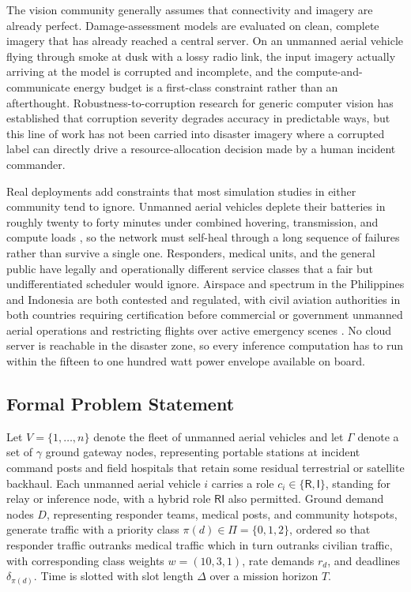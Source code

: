 \documentclass[drones,article,submit,moreauthors]{Definitions/mdpi}
\begin{document}
The vision community generally assumes that connectivity and imagery are already perfect. Damage-assessment models \cite{gupta2019xbd,weber2020building} are evaluated on clean, complete imagery that has already reached a central server. On an unmanned aerial vehicle flying through smoke at dusk with a lossy radio link, the input imagery actually arriving at the model is corrupted and incomplete, and the compute-and-communicate energy budget is a first-class constraint rather than an afterthought. Robustness-to-corruption research for generic computer vision \cite{hendrycks2019benchmarking} has established that corruption severity degrades accuracy in predictable ways, but this line of work has not been carried into disaster imagery where a corrupted label can directly drive a resource-allocation decision made by a human incident commander.

Real deployments add constraints that most simulation studies in either community tend to ignore. Unmanned aerial vehicles deplete their batteries in roughly twenty to forty minutes under combined hovering, transmission, and compute loads \cite{mozaffari2019tutorial,zeng2019energy}, so the network must self-heal through a long sequence of failures rather than survive a single one. Responders, medical units, and the general public have legally and operationally different service classes that a fair but undifferentiated scheduler would ignore. Airspace and spectrum in the Philippines and Indonesia are both contested and regulated, with civil aviation authorities in both countries requiring certification before commercial or government unmanned aerial operations and restricting flights over active emergency scenes \cite{caap_rpas,icao_indonesia_uas}. No cloud server is reachable in the disaster zone, so every inference computation has to run within the fifteen to one hundred watt power envelope available on board.

\subsection{Formal Problem Statement}

Let $V = \{1, \dots, n\}$ denote the fleet of unmanned aerial vehicles and let $\Gamma$ denote a set of $\gamma$ ground gateway nodes, representing portable stations at incident command posts and field hospitals that retain some residual terrestrial or satellite backhaul. Each unmanned aerial vehicle $i$ carries a role $c_i \in \{\mathsf{R}, \mathsf{I}\}$, standing for relay or inference node, with a hybrid role $\mathsf{RI}$ also permitted. Ground demand nodes $D$, representing responder teams, medical posts, and community hotspots, generate traffic with a priority class $\pi(d) \in \Pi = \{0, 1, 2\}$, ordered so that responder traffic outranks medical traffic which in turn outranks civilian traffic, with corresponding class weights $w = (10, 3, 1)$, rate demands $r_d$, and deadlines $\delta_{\pi(d)}$. Time is slotted with slot length $\Delta$ over a mission horizon $T$.
\end{document}
